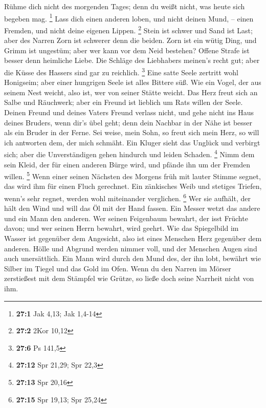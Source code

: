  Rühme dich nicht des morgenden Tages; denn du weißt
nicht, was heute sich begeben mag. \footnote{\textbf{27:1} Jak 4,13; Jak
  1,4-14}  Lass dich einen anderen loben, und nicht deinen
Mund, -- einen Fremden, und nicht deine eigenen Lippen. \footnote{\textbf{27:2}
  2Kor 10,12}  Stein ist schwer und Sand ist Last; aber
des Narren Zorn ist schwerer denn die beiden.  Zorn ist
ein wütig Ding, und Grimm ist ungestüm; aber wer kann vor dem Neid
bestehen?  Offene Strafe ist besser denn heimliche Liebe.
 Die Schläge des Liebhabers meinen's recht gut; aber die
Küsse des Hassers sind gar zu reichlich. \footnote{\textbf{27:6} Ps
  141,5}  Eine satte Seele zertritt wohl Honigseim; aber
einer hungrigen Seele ist alles Bittere süß.  Wie ein
Vogel, der aus seinem Nest weicht, also ist, wer von seiner Stätte
weicht.  Das Herz freut sich an Salbe und Räuchwerk; aber
ein Freund ist lieblich um Rats willen der Seele.  Deinen
Freund und deines Vaters Freund verlass nicht, und gehe nicht ins Haus
deines Bruders, wenn dir's übel geht; denn dein Nachbar in der Nähe ist
besser als ein Bruder in der Ferne.  Sei weise, mein
Sohn, so freut sich mein Herz, so will ich antworten dem, der mich
schmäht.  Ein Kluger sieht das Unglück und verbirgt sich;
aber die Unverständigen gehen hindurch und leiden Schaden. \footnote{\textbf{27:12}
  Spr 21,29; Spr 22,3}  Nimm dem sein Kleid, der für
einen anderen Bürge wird, und pfände ihn um der Fremden willen.
\footnote{\textbf{27:13} Spr 20,16}  Wenn einer seinen
Nächsten des Morgens früh mit lauter Stimme segnet, das wird ihm für
einen Fluch gerechnet.  Ein zänkisches Weib und stetiges
Triefen, wenn's sehr regnet, werden wohl miteinander verglichen.
\footnote{\textbf{27:15} Spr 19,13; Spr 25,24}  Wer sie
aufhält, der hält den Wind und will das Öl mit der Hand fassen.
 Ein Messer wetzt das andere und ein Mann den anderen.
 Wer seinen Feigenbaum bewahrt, der isst Früchte davon;
und wer seinen Herrn bewahrt, wird geehrt.  Wie das
Spiegelbild im Wasser ist gegenüber dem Angesicht, also ist eines
Menschen Herz gegenüber dem anderen.  Hölle und Abgrund
werden nimmer voll, und der Menschen Augen sind auch unersättlich.
 Ein Mann wird durch den Mund des, der ihn lobt, bewährt
wie Silber im Tiegel und das Gold im Ofen.  Wenn du den
Narren im Mörser zerstießest mit dem Stämpfel wie Grütze, so ließe doch
seine Narrheit nicht von ihm.


